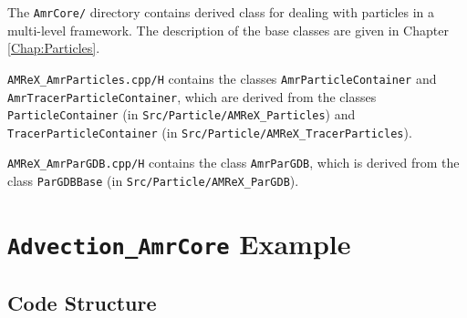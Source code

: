The {\tt AmrCore/} directory contains derived class for dealing with particles 
in a multi-level framework.  The description of the base classes
are given in Chapter \ref{Chap:Particles}.

{\tt AMReX\_AmrParticles.cpp/H} contains the classes {\tt AmrParticleContainer}
and {\tt AmrTracerParticleContainer}, which are derived from the classes
{\tt ParticleContainer} (in {\tt Src/Particle/AMReX\_Particles})
and {\tt TracerParticleContainer} (in {\tt Src/Particle/AMReX\_TracerParticles}).

{\tt AMReX\_AmrParGDB.cpp/H} contains the class {\tt AmrParGDB}, which is derived from
the class {\tt ParGDBBase} (in {\tt Src/Particle/AMReX\_ParGDB}).

\section{{\tt Advection\_AmrCore} Example}

\subsection{Code Structure}

